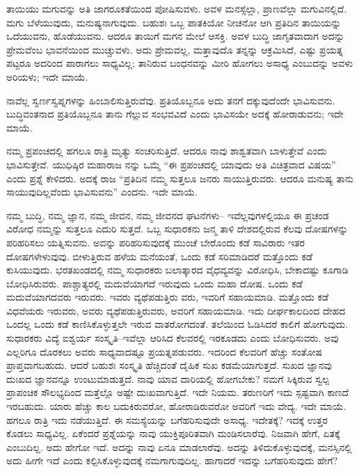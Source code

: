 ತಾಯಿಯು ಮಗುವನ್ನು ಅತಿ ಜಾಗರೂಕತೆಯಿಂದ ಪೋಷಿಸುವಳು. ಅವಳ ಮನಸ್ಸೆಲ್ಲಾ, ಪ್ರಾಣವೆಲ್ಲಾ ಮಗುವಿನಲ್ಲಿದೆ. ಮಗು ಬೆಳೆಯುವುದು, ಮನುಷ್ಯನಾಗುವುದು. ಬಹುಶಃ ಒಬ್ಬ ಪಾತಕಿಯೋ ನೀಚನೋ ಆಗಿ ಪ್ರತಿದಿನ ತಾಯಿಯನ್ನು ಒದೆಯುವನು, ಹೊಡೆಯುವನು. ಆದರೂ ತಾಯಿಗೆ ಮಗನ ಮೇಲೆ ಆಸಕ್ತಿ. ಅವಳ ಬುದ್ಧಿ ಜಾಗೃತವಾದಾಗ ಅದನ್ನು ಪ್ರೇಮವೆಂಬ ಭಾವನೆಯಿಂದ ಮುಚ್ಚುವಳು. ಅದು ಪ್ರೇಮವಲ್ಲ, ಮತ್ತಾವುದೊ ತನ್ನನ್ನು ಆಕ್ರಮಿಸಿದೆ, ಎಷ್ಟು ಪ್ರಯತ್ನ ಪಟ್ಟರೂ ಅದರಿಂದ ಪಾರಾಗಲು ಸಾಧ್ಯವಿಲ್ಲ; ತಾನಿರುವ ಬಂಧನವನ್ನು ಮೀರಿ ಹೋಗಲು ಅಸಾಧ್ಯ ಎಂಬುದನ್ನು ಅವಳು ಅರಿಯಳು; ಇದೇ ಮಾಯೆ.

ನಾವೆಲ್ಲ ಸ್ವರ್ಣಸ್ವಪ್ನಗಳನ್ನು ಹಿಂಬಾಲಿಸುತ್ತಿರುವೆವು. ಪ್ರತಿಯೊಬ್ಬನೂ ಅದು ತನಗೆ ದಕ್ಕುವುದೆಂದೇ ಭಾವಿಸುವನು. ಬುದ್ಧಿವಂತನಾದ ಪ್ರತಿಯೊಬ್ಬನೂ ತಾನು ಗೆಲ್ಲುವ ಸಂಭವವಿದೆ ಎಂದು ಭಾವಿಸಯೇ ಅದಕ್ಕೆ ಹೋರಾಡುವನು; ಇದೇ ಮಾಯೆ.

ನಮ್ಮ ಪ್ರಪಂಚದಲ್ಲಿ ಹಗಲೂ ರಾತ್ರಿ ಮೃತ್ಯು ಸಂಚರಿಸುತ್ತಿದೆ. ಆದರೂ ನಾವು ಶಾಶ್ವತವಾಗಿ ಬಾಳುತ್ತೇವೆ ಎಂದು ಭಾವಿಸುತ್ತೇವೆ. ಯುಧಿಷ್ಠಿರ ಮಹಾರಾಜ ನನ್ನು ಒಮ್ಮೆ “ಈ ಪ್ರಪಂಚದಲ್ಲಿ ಯಾವುದು ಅತಿ ವಿಚಿತ್ರವಾದ ವಿಷಯ” ಎಂದು ಪ್ರಶ್ನೆ ಕೇಳಿದರು. ಅದಕ್ಕೆ ರಾಜ “ಪ್ರತಿದಿನ ನಮ್ಮ ಸುತ್ತಲೂ ಜನರು ಸಾಯುತ್ತಿರುವರು. ಆದರೂ ಮನುಷ್ಯ ತಾನು ಸಾಯುವುದಿಲ್ಲವೆಂದು ಭಾವಿಸುವನು” ಎಂದನು. ಇದೇ ಮಾಯೆ.

ನಮ್ಮ ಬುದ್ಧಿ, ನಮ್ಮ ಜ್ಞಾನ, ನಮ್ಮ ಜೀವನ, ನಮ್ಮ ಜೀವನದ ಘಟನೆಗಳು– ಇವೆಲ್ಲವುಗಳಲ್ಲಿಯೂ ಈ ಪ್ರಚಂಡ ವಿರೋಧ ನಮ್ಮನ್ನು ಸುತ್ತಲೂ ಎದುರಿ ಸುತ್ತದೆ. ಒಬ್ಬ ಸುಧಾರಕನು ಜನ್ಮ ತಾಳಿ ದೇಶದಲ್ಲಿರುವ ಕೆಲವು ದೋಷಗಳನ್ನು ಪರಿಹರಿಸಲು ಯತ್ನಿಸುವನು. ಅವನ್ನು ಪರಿಹರಿಸುವುದಕ್ಕೆ ಮುಂಚೆ ಬೇರೊಂದು ಕಡೆ ಸಾವಿರಾರು ಇತರ ದೋಷಗಳೇಳುವುವು. ಬೀಳುತ್ತಿರುವ ಹಳೆಯ ಮನೆಯಂತೆ, ಒಂದು ಕಡೆ ಸರಿಮಾಡಿದರೆ ಮತ್ತೊಂದು ಕಡೆ ಕುಸಿಯುವುದು. ಭರತಖಂಡದಲ್ಲಿ ನಮ್ಮ ಸುಧಾರಕರು ಬಲಾತ್ಕಾರದ ವೈಧವ್ಯವನ್ನು ವಿರೋಧಿಸಿ, ಬೇಕಾದಷ್ಟು ಕೂಗಾಡಿ ಬೋಧಿಸಿರುವರು. ಪಾಶ್ಚಾತ್ಯರಲ್ಲಿ ಮದುವೆಯಾಗದೆ ಇರುವುದು ಒಂದು ಮಹಾ ದೋಷ. ಒಂದು ಕಡೆ ಮದುವೆಯಾಗದವರು ಇರುವರು. ಇವರು ವ್ಯಥೆಪಡುತ್ತಿರು ವರು, ಇವರಿಗೆ ಸಹಾಯಮಾಡಿ. ಮತ್ತೊಂದು ಕಡೆ ವಿಧವೆಯರು ಇರುವರು, ಅವರು ವ್ಯಥೆಪಡುತ್ತಿರುವರು, ಅವರಿಗೆ ಸಹಾಯಮಾಡಿ. ಇದು ದೀರ್ಘಕಾಲದಿಂದ ದೇಹದ ಒಂದಲ್ಲ ಒಂದು ಕಡೆ ಕಾಣಿಸಿಕೊಳ್ಳುತ್ತಲೇ ಇರುವ ವಾತರೋಗದಂತೆ. ತಲೆಯಿಂದ ಓಡಿಸಿದರೆ ಕಾಲಿಗೆ ಹೋಗುವುದು. ಸುಧಾರಕರು ವಿದ್ಯೆ ಐಶ್ವರ್ಯ ಸಂಸ್ಕೃತಿ–ಇವೆಲ್ಲಾ ಆರಿಸಿದ ಕೆಲವರಲ್ಲಿ ಇರಕೂಡದು ಎಂದು ಬೋಧಿಸುವರು. ಅವು ಎಲ್ಲರಿಗೂ ದೊರಕಲು ಅವರು ಸಾಧ್ಯವಾದಷ್ಟೂ ಪ್ರಯತ್ನಪಡುವರು. ಇದರಿಂದ ಕೆಲವರಿಗೆ ಹೆಚ್ಚು ಸಂತೋಷ ಪ್ರಾಪ್ತವಾಗಬಹುದು. ಆದರೆ ಬಹುಶಃ ಸಂಸ್ಕೃತಿ ಹೆಚ್ಚಿದಂತೆ ದೈಹಿಕ ಸುಖ ಕಡಮೆಯಾಗುತ್ತದೆ. ಸುಖದ ಜ್ಞಾನವು ದುಃಖದ ಜ್ಞಾನವನ್ನೂ ಉಂಟುಮಾಡುತ್ತದೆ. ನಾವು ಯಾವ ದಾರಿಯಲ್ಲಿ ಹೋಗಬೇಕು? ನಮಗೆ ಸಿಕ್ಕಿರುವ ಸ್ವಲ್ಪ ಪ್ರಾಪಂಚಿಕ ಸೌಲಭ್ಯದಿಂದ ಮತ್ತೆಲ್ಲೊ ಅಷ್ಟೇ ದುಃಖವಾಗುತ್ತಿದೆ. ಇದೇ ನಿಯಮ. ತರುಣರಿಗೆ ಇದು ಸ್ಪಷ್ಟವಾಗಿ ಕಾಣದೆ ಇರಬಹುದು. ಯಾರು ಹೆಚ್ಚು ಕಾಲ ಬದುಕಿರುವರೋ, ಹೋರಾಡಿರುವರೋ ಅವರಿಗೆ ಇದು ವೇದ್ಯ. ಇದೇ ಮಾಯೆ. ಹಗಲೂ ರಾತ್ರಿ ಇದು ನಡೆಯುತ್ತಿದೆ. ಈ ಸಮಸ್ಯೆಯನ್ನು ಬಗೆಹರಿಸುವುದೇ ಅಸಾಧ್ಯ. ಇದೇತಕ್ಕೆ? ಇದಕ್ಕೆ ಉತ್ತರ ಕೊಡಲು ಸಾಧ್ಯವಿಲ್ಲ. ಏಕೆಂದರೆ ಪ್ರಶ್ನೆಯನ್ನು ನಾವು ಯುಕ್ತಿಪೂರಿತವಾಗಿ ಮಂಡಿಸಲಾರೆವು. ನಿಜವಾಗಿ ಹೇಗೆ, ಏತಕ್ಕೆ ಎಂಬುದಿಲ್ಲ. ಅದು ಹೇಗೋ ಇದೆ. ಅದನ್ನು ನಾವು ಏನೂ ಮಾಡಲಾರೆವು. ಅದನ್ನು ತಿಳಿದುಕೊಳ್ಳುವುದಕ್ಕೆ, ಮನಸ್ಸಿನಲ್ಲಿ ಅದು ಹೀಗೇ ಇದೆ ಎಂದು ಕಲ್ಪಿಸಿಕೊಳ್ಳುವುದಕ್ಕೆ ನಮಗಾಗುವುದಿಲ್ಲ. ಹಾಗಾದರೆ ಇದನ್ನು ಬಗೆಹರಿಸುವುದು ಹೇಗೆ?

